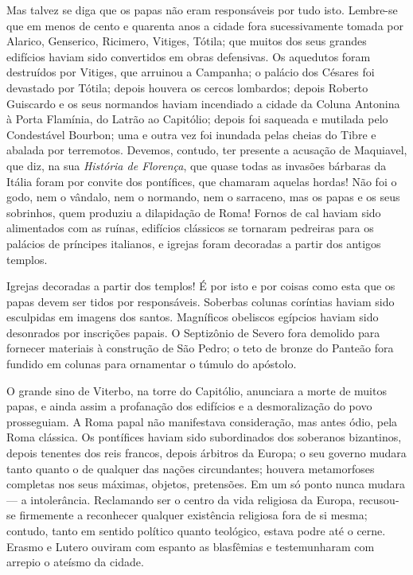 \documentclass[11pt,a5paper,twoside,openany]{book}
\begin{document}
Mas talvez se diga que os papas não eram responsáveis por tudo isto. Lembre-se que em menos de cento e quarenta anos a cidade fora sucessivamente tomada por Alarico, Genserico, Ricimero, Vitiges, Tótila; que muitos dos seus grandes edifícios haviam sido convertidos em obras defensivas. Os aquedutos foram destruídos por Vitiges, que arruinou a Campanha; o palácio dos Césares foi devastado por Tótila; depois houvera os cercos lombardos; depois Roberto Guiscardo e os seus normandos haviam incendiado a cidade da Coluna Antonina à Porta Flamínia, do Latrão ao Capitólio; depois foi saqueada e mutilada pelo Condestável Bourbon; uma e outra vez foi inundada pelas cheias do Tibre e abalada por terremotos. Devemos, contudo, ter presente a acusação de Maquiavel, que diz, na sua \textit{História de Florença}, que quase todas as invasões bárbaras da Itália foram por convite dos pontífices, que chamaram aquelas hordas! Não foi o godo, nem o vândalo, nem o normando, nem o sarraceno, mas os papas e os seus sobrinhos, quem produziu a dilapidação de Roma! Fornos de cal haviam sido alimentados com as ruínas, edifícios clássicos se tornaram pedreiras para os palácios de príncipes italianos, e igrejas foram decoradas a partir dos antigos templos.

Igrejas decoradas a partir dos templos! É por isto e por coisas como esta que os papas devem ser tidos por responsáveis. Soberbas colunas coríntias haviam sido esculpidas em imagens dos santos. Magníficos obeliscos egípcios haviam sido desonrados por inscrições papais. O Septizônio de Severo fora demolido para fornecer materiais à construção de São Pedro; o teto de bronze do Panteão fora fundido em colunas para ornamentar o túmulo do apóstolo.

O grande sino de Viterbo, na torre do Capitólio, anunciara a morte de muitos papas, e ainda assim a profanação dos edifícios e a desmoralização do povo prosseguiam. A Roma papal não manifestava consideração, mas antes ódio, pela Roma clássica. Os pontífices haviam sido subordinados dos soberanos bizantinos, depois tenentes dos reis francos, depois árbitros da Europa; o seu governo mudara tanto quanto o de qualquer das nações circundantes; houvera metamorfoses completas nos seus máximas, objetos, pretensões. Em um só ponto nunca mudara — a intolerância. Reclamando ser o centro da vida religiosa da Europa, recusou-se firmemente a reconhecer qualquer existência religiosa fora de si mesma; contudo, tanto em sentido político quanto teológico, estava podre até o cerne. Erasmo e Lutero ouviram com espanto as blasfêmias e testemunharam com arrepio o ateísmo da cidade.
\end{document}

